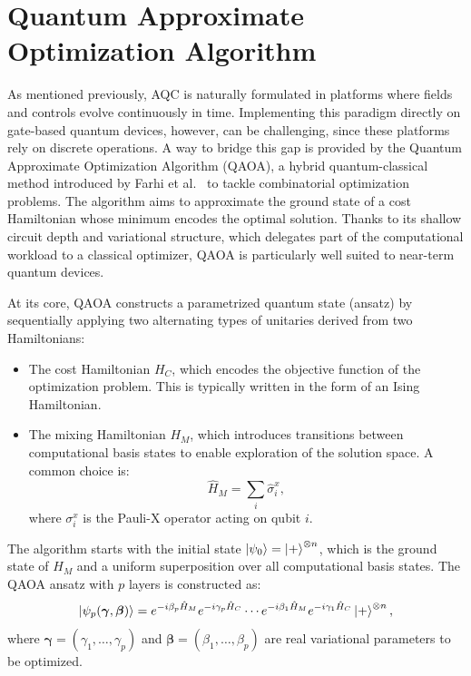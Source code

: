 \section{Quantum Approximate Optimization Algorithm}
\label{Section:QAOA}

As mentioned previously, AQC is naturally formulated in platforms where fields and controls evolve continuously in time. Implementing this paradigm directly on gate-based quantum devices, however, can be challenging, since these platforms rely on discrete operations. A way to bridge this gap is provided by the Quantum Approximate Optimization Algorithm (QAOA), a hybrid quantum-classical method introduced by Farhi et al.~\cite{farhi_quantum_2014} to tackle combinatorial optimization problems. The algorithm aims to approximate the ground state of a cost Hamiltonian whose minimum encodes the optimal solution. Thanks to its shallow circuit depth and variational structure, which delegates part of the computational workload to a classical optimizer, QAOA is particularly well suited to near-term quantum devices.

At its core, QAOA constructs a parametrized quantum state (ansatz) by sequentially applying
two alternating types of unitaries derived from two Hamiltonians:
\begin{itemize}
    \item The cost Hamiltonian $H_C$, which encodes the objective function of the optimization
    problem. This is typically written in the form of an Ising Hamiltonian.
    \item The mixing Hamiltonian $H_M$, which introduces transitions between computational
    basis states to enable exploration of the solution space. A common choice is:
    \begin{equation}
        \hat{H}_M = \sum_i \hat{\sigma}_i^x,
        \label{eq:mixing_hamiltonian}
    \end{equation}
    where $\sigma_i^x$ is the Pauli-X operator acting on qubit $i$.
\end{itemize}

The algorithm starts with the initial state $\ket{\psi_0} = \ket{+}^{\otimes n}$, which is
the ground state of $H_M$ and a uniform superposition over all computational basis states.
The QAOA ansatz with $p$ layers is constructed as:
\begin{equation}
    \ket{\psi_p(\bm{\gamma}, \bm{\beta})} = e^{-i \beta_p \hat{H}_M} e^{- i \gamma_p \hat{H}_C} \cdots
    e^{-i \beta_1 \hat{H}_M} e^{- i \gamma_1 \hat{H}_C} \ket{+}^{\otimes n},
    \label{eq:qaoa_state_evolution}
\end{equation}
where $\bm{\gamma} = (\gamma_1, \dots, \gamma_p)$ and $\bm{\beta} = (\beta_1, \dots, \beta_p)$
are real variational parameters to be optimized.

